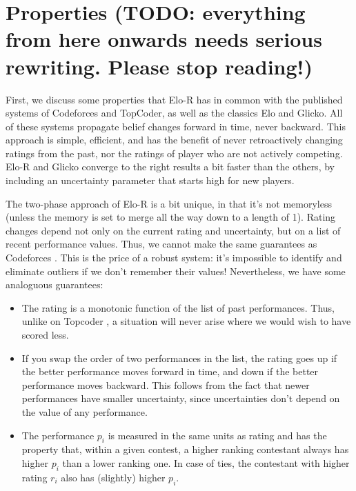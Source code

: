 \documentclass{article}
\begin{document}
\pagebreak

\section{Properties (TODO: everything from here onwards needs serious rewriting. Please stop reading!)}

First, we discuss some properties that Elo-R has in common with the published systems of Codeforces and TopCoder, as well as the classics Elo and Glicko. All of these systems propagate belief changes forward in time, never backward. This approach is simple, efficient, and has the benefit of never retroactively changing ratings from the past, nor the ratings of player who are not actively competing. Elo-R and Glicko converge to the right results a bit faster than the others, by including an uncertainty parameter that starts high for new players.

The two-phase approach of Elo-R is a bit unique, in that it's not memoryless (unless the memory is set to merge all the way down to a length of 1). Rating changes depend not only on the current rating and uncertainty, but on a list of recent performance values. Thus, we cannot make the same guarantees as Codeforces \cite{Codeforces}. This is the price of a robust system: it's impossible to identify and eliminate outliers if we don't remember their values! Nevertheless, we have some analoguous guarantees:
\begin{itemize}
\item The rating is a monotonic function of the list of past performances. Thus, unlike on Topcoder \cite{forivsektheoretical}, a situation will never arise where we would wish to have scored less.
\item If you swap the order of two performances in the list, the rating goes up if the better performance moves forward in time, and down if the better performance moves backward. This follows from the fact that newer performances have smaller uncertainty, since uncertainties don't depend on the value of any performance.
\item The performance $p_i$ is measured in the same units as rating and has the property that, within a given contest, a higher ranking contestant always has higher $p_i$ than a lower ranking one. In case of ties, the contestant with higher rating $r_i$ also has (slightly) higher $p_i$.
\end{itemize}
\end{document}
